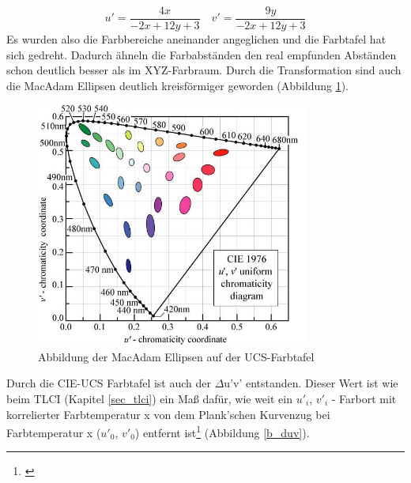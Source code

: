 \begin{equation}\label{gl_ucs1}
		u' = \frac{4x}{-2x+12y+3} \quad v' = \frac{9y}{-2x+12y+3}
\end{equation}
Es wurden also die Farbbereiche aneinander angeglichen und die Farbtafel hat sich gedreht. Dadurch ähneln die Farbabständen den real empfunden Abständen schon deutlich besser als im XYZ-Farbraum. Durch die Transformation sind auch die MacAdam Ellipsen deutlich kreisförmiger geworden (Abbildung \ref{b_ucs}).  

\begin{figure}[H]     %
\centering
\includegraphics[width=0.8\textwidth]{bilder/ucs} 
\caption {Abbildung der MacAdam Ellipsen auf der UCS-Farbtafel \protect\footnotemark}\label{b_ucs}
\end{figure}


\noindent Durch die CIE-UCS Farbtafel ist auch der $\Delta$u'v' entstanden. Dieser Wert ist wie beim TLCI (Kapitel \ref{sec_tlci}) ein Maß dafür, wie weit ein $u'_{i}$, $v'_{i}$ - Farbort mit korrelierter Farbtemperatur x von dem Plank'schen Kurvenzug bei Farbtemperatur x ($u'_{0}$, $v'_{0}$) entfernt ist\footnote{\cite[566]{jiyupe}} (Abbildung \ref{b_duv}).

